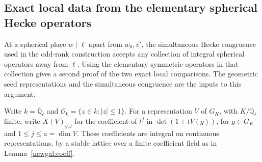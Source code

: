 \subsection{Exact local data from the elementary spherical Hecke operators}

At a spherical place \(w\mid\ell\) apart from \(w_0,v'\), the
simultaneous Hecke congruence used in the odd-rank construction accepts
any collection of integral spherical operators away from \(\ell\).
Using the elementary symmetric operators in that collection gives a
second proof of the two exact local comparisons. The geometric seed
representations and the simultaneous congruence are the inputs to this
argument.

Write \(k=\overline{\mathbb Q}_\ell\) and \(\mathcal O_k=\{z\in k:|z|\le1\}\).
For a representation \(V\) of \(G_K\), with \(K/\mathbb Q_\ell\) finite,
write \(X(V)_{g,j}\) for the coefficient of \(t^j\) in
\(\det(1+tV(g))\), for \(g\in G_K\) and \(1\le j\le a=\dim V\).
These coefficients are integral on continuous representations, by a stable
lattice over a finite coefficient field as in Lemma~\ref{newgal:coeff}.

